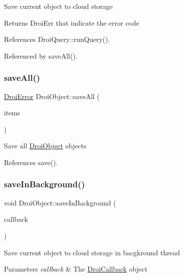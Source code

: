 Save current object to cloud storage \begin{DoxyReturn}{Returns}
Droi\+Err that indicate the error code 
\end{DoxyReturn}


References Droi\+Query\+::run\+Query().



Referenced by save\+All().

\mbox{\label{class_droi_object_ae9516e7686cd4a7dfacf0f81de6e552a}} 
\subsubsection{\texorpdfstring{save\+All()}{saveAll()}}
{\footnotesize\ttfamily \hyperlink{class_droi_error}{Droi\+Error} Droi\+Object\+::save\+All (\begin{DoxyParamCaption}\item[{\hyperlink{class_ref_vector}{Ref\+Vector} $\ast$}]{items }\end{DoxyParamCaption})\hspace{0.3cm}{\ttfamily [static]}}

Save all \hyperlink{class_droi_object}{Droi\+Object} objects 

References save().

\mbox{\label{class_droi_object_ac939667f3885dc36fc08c599e552fc64}} 
\subsubsection{\texorpdfstring{save\+In\+Background()}{saveInBackground()}}
{\footnotesize\ttfamily void Droi\+Object\+::save\+In\+Background (\begin{DoxyParamCaption}\item[{\hyperlink{struct_droi_callback}{Droi\+Callback}$<$ \hyperlink{class_droi_error}{Droi\+Error} $>$\+::on\+Callback}]{callback }\end{DoxyParamCaption})}

Save current object to cloud storage in bacgkround thread 
\begin{DoxyParams}{Parameters}
{\em callback} & The \hyperlink{struct_droi_callback}{Droi\+Callback} object \\
\hline
\end{DoxyParams}


